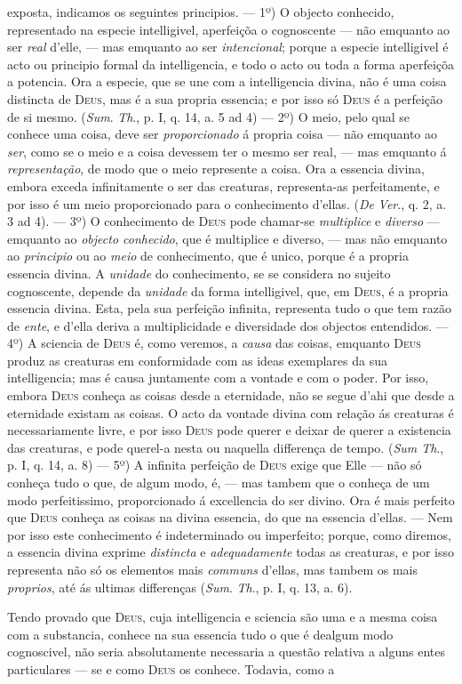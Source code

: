 exposta, indicamos os seguintes principios. --- 1º) O objecto conhecido, representado na especie intelligivel, aperfeiçõa o cognoscente --- não emquanto ao ser \emph{real} d'elle, --- mas emquanto ao ser \emph{intencional}; porque a especie intelligivel é acto ou principio formal da intelligencia, e todo o acto ou toda a forma aperfeiçõa a potencia. Ora a especie, que se une com a intelligencia divina, não é uma coisa distincta de \textsc{Deus}, mas é a sua propria essencia; e por isso só \textsc{Deus} é a perfeição de si mesmo. (\emph{Sum}. \emph{Th}., p. I, q. 14, a. 5 ad 4) --- 2º) O meio, pelo qual se conhece uma coisa, deve ser \emph{proporcionado} á propria coisa --- não emquanto ao \emph{ser}, como se o meio e a coisa devessem ter o mesmo ser real, --- mas emquanto á \emph{representação}, de modo que o meio represente a coisa. Ora a essencia divina, embora exceda infinitamente o ser das creaturas, representa-as perfeitamente, e por isso é um meio proporcionado para o conhecimento d'ellas. (\emph{De} \emph{Ver}., q. 2, a. 3 ad 4). --- 3º) O conhecimento de \textsc{Deus} pode chamar-se \emph{multiplice} e \emph{diverso} --- emquanto ao \emph{objecto conhecido}, que é multiplice e diverso, --- mas não emquanto ao \emph{principio} ou ao \emph{meio} de conhecimento, que é unico, porque é a propria essencia divina. A \emph{unidade} do conhecimento, se se considera no sujeito cognoscente, depende da \emph{unidade} da forma intelligivel, que, em \textsc{Deus}, é a propria essencia divina. Esta, pela sua perfeição infinita, representa tudo o que tem razão de \emph{ente}, e d'ella deriva a multiplicidade e diversidade dos objectos entendidos. --- 4º) A sciencia de \textsc{Deus} é, como veremos, a \emph{causa} das coisas, emquanto \textsc{Deus} produz as creaturas em conformidade com as ideas exemplares da sua intelligencia; mas é causa juntamente com a vontade e com o poder. Por isso, embora \textsc{Deus} conheça as coisas desde a eternidade, não se segue d'ahi que desde a eternidade existam as coisas. O acto da vontade divina com relação ás creaturas é necessariamente livre, e por isso \textsc{Deus} pode querer e deixar de querer a existencia das creaturas, e pode querel-a nesta ou naquella differença de tempo. (\emph{Sum Th}., p. I, q. 14, a. 8) --- 5º) A infinita perfeição de \textsc{Deus} exige que Elle --- não só conheça tudo o que, de algum modo, é, --- mas tambem que o conheça de um modo perfeitissimo, proporcionado á excellencia do ser divino. Ora é mais perfeito que \textsc{Deus} conheça as coisas na divina essencia, do que na essencia d'ellas. --- Nem por isso este conhecimento é indeterminado ou imperfeito; porque, como diremos, a essencia divina exprime \emph{distincta} e \emph{adequadamente} todas as creaturas, e por isso representa não só os elementos mais \emph{communs} d'ellas, mas tambem os mais \emph{proprios}, até ás ultimas differenças (\emph{Sum}. \emph{Th}., p. I, q. 13, a. 6).\par Tendo provado que \textsc{Deus}, cuja intelligencia e sciencia são uma e a mesma coisa com a substancia, conhece na sua essencia tudo o que é dealgum modo cognoscivel, não seria absolutamente necessaria a questão relativa a alguns entes particulares --- se e como \textsc{Deus} os conhece. Todavia, como a 